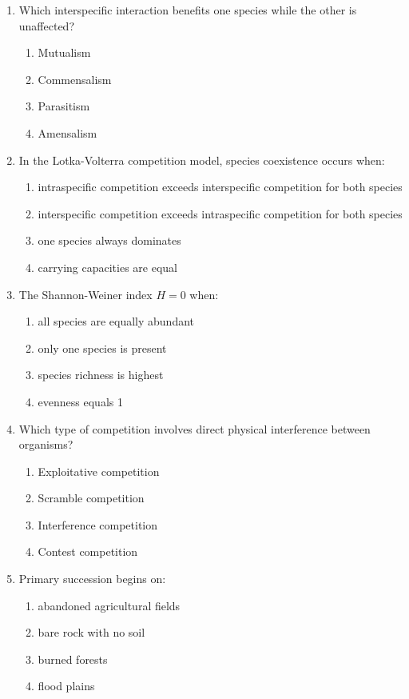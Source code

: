 \documentclass[11pt]{article}
\begin{document}
\begin{enumerate}[label=\textbf{\arabic*.}]

\item Which interspecific interaction benefits one species while the other is unaffected?
\begin{enumerate}[label=\Alph*.]
  \item Mutualism
  \item Commensalism
  \item Parasitism
  \item Amensalism
\end{enumerate}

\item In the Lotka-Volterra competition model, species coexistence occurs when:
\begin{enumerate}[label=\Alph*.]
  \item intraspecific competition exceeds interspecific competition for both species
  \item interspecific competition exceeds intraspecific competition for both species
  \item one species always dominates
  \item carrying capacities are equal
\end{enumerate}

\item The Shannon-Weiner index $H = 0$ when:
\begin{enumerate}[label=\Alph*.]
  \item all species are equally abundant
  \item only one species is present
  \item species richness is highest
  \item evenness equals 1
\end{enumerate}

\item Which type of competition involves direct physical interference between organisms?
\begin{enumerate}[label=\Alph*.]
  \item Exploitative competition
  \item Scramble competition
  \item Interference competition
  \item Contest competition
\end{enumerate}

\item Primary succession begins on:
\begin{enumerate}[label=\Alph*.]
  \item abandoned agricultural fields
  \item bare rock with no soil
  \item burned forests
  \item flood plains
\end{enumerate}


\end{enumerate}
\end{document}
